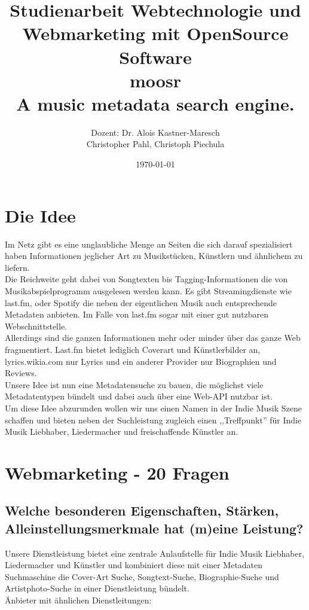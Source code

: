 \documentclass[11pt]{scrreprt}
\title{Studienarbeit Webtechnologie und Webmarketing mit OpenSource Software \\
    \textcolor{WildStrawberry}{\huge{moosr}} \\
    \normalsize{A music metadata search engine.}
}
\author{Dozent: Dr. Alois Kastner-Maresch\\
Christopher Pahl, Christoph Piechula}
\date{\today}
\begin{document}
\maketitle
\tableofcontents
\chapter{Die Idee}
Im Netz gibt es eine unglaubliche Menge an Seiten die sich darauf spezialisiert
haben Informationen jeglicher Art zu Musikstücken, Künstlern und ähnlichem zu
liefern.
\\
Die Reichweite geht dabei von Songtexten bis Tagging-Informationen die von
Musikabspielprogramm ausgelesen werden kann. Es gibt Streamingdienste wie last.fm,
oder Spotify die neben der eigentlichen Musik auch entsprechende Metadaten anbieten. 
Im Falle von last.fm sogar mit einer gut nutzbaren Webschnittstelle.
\\
Allerdings sind die ganzen Informationen mehr oder minder über das ganze Web
fragmentiert. Last.fm bietet lediglich Coverart und Künstlerbilder an, 
lyrics.wikia.com nur Lyrics und ein anderer Provider nur Biographien und
Reviews.
\\
Unsere Idee ist nun eine Metadatensuche zu bauen, die möglichst viele
Metadatentypen bündelt und dabei auch über eine Web-API nutzbar ist.
\\
Um diese Idee abzurunden wollen wir uns einen Namen in der Indie Musik Szene
schaffen und bieten neben der Suchleistung zugleich einen ,,Treffpunkt'' für Indie
Musik Liebhaber, Liedermacher und freischaffende Künstler an.

\chapter{Webmarketing - 20 Fragen}

\label{wettbewerb}\section{Welche besonderen Eigenschaften, Stärken,
Alleinstellungsmerkmale hat (m)eine Leistung?}

Unsere Dienstleistung bietet eine zentrale Anlaufstelle für Indie Musik
Liebhaber, Liedermacher und Künstler und kombiniert diese mit einer Metadaten Suchmaschine
die Cover-Art Suche, Songtext-Suche, Biographie-Suche und Artistphoto-Suche in
einer Dienstleistung bündelt.
\\
Änbieter mit ähnlichen Dienstleitungen: \\
\end{document}
